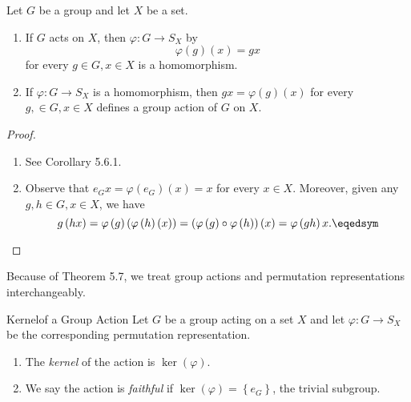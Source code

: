 \documentclass[pmath347]{subfiles}
\begin{document}
    \clearpage
    \begin{theorem}{}
        Let $G$ be a group and let $X$ be a set.
        \begin{enumerate}
            \item If $G$ acts on $X$, then $\varphi:G\to S_X$ by
                \begin{equation*}
                    \varphi\left( g \right) \left( x \right) = gx
                \end{equation*}
                for every $g\in G, x\in X$ is a homomorphism.
            \item If $\varphi:G\to S_X$ is a homomorphism, then $gx = \varphi\left( g \right) \left( x \right) $ for every $g,\in G, x\in X$ defines a group action of $G$ on $X$.
        \end{enumerate}
    \end{theorem}

    \begin{proof}
        \begin{enumerate}
            \item See Corollary 5.6.1. \qqqedsym
            \item Observe that $e_Gx = \varphi\left( e_G \right) \left( x \right) = x$ for every $x\in X$. Moreover, given any $g,h\in G, x\in X$, we have
                \begin{equation*}
                    g\left( hx \right) = \varphi\left( g \right) \left( \varphi\left( h \right) \left( x \right)  \right) = \left( \varphi\left( g \right) \circ\varphi\left( h \right)  \right) \left( x \right) = \varphi\left( gh \right) x. \eqedsym
                \end{equation*}
        \end{enumerate}
    \end{proof}

    \np Because of Theorem 5.7, we treat group actions and permutation representations interchangeably.

    \begin{definition}{Kernel}{of a Group Action}
        Let $G$ be a group acting on a set $X$ and let $\varphi:G\to S_X$ be the corresponding permutation representation.
        \begin{enumerate}
            \item The \emph{kernel} of the action is $\ker\left( \varphi \right)$.
            \item We say the action is \emph{faithful} if $\ker\left( \varphi \right) = \left\lbrace e_G \right\rbrace$, the trivial subgroup.
        \end{enumerate}
    \end{definition}
\end{document}
